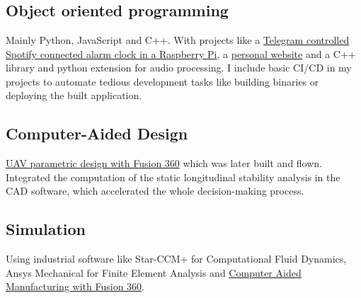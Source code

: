  \section*{\faWrench} \label{sec:skills}

\subsection{Object oriented programming}
Mainly Python, JavaScript and C++. With projects like a
\href{https://github.com/esdandreu/WakePi}{Telegram controlled Spotify
connected alarm clock in a Raspberry Pi}, a
\href{https://github.com/esdandreu/esdandreu.github.io}{personal website}
and a C++ library and python extension for audio processing. I include basic
CI/CD in my projects to automate tedious development tasks like
building binaries or deploying the built application.

\subsection{Computer-Aided Design}
\href{https://1drv.ms/b/s!AqZvnCxLmXx9hL9DSw-Ee4zU6H5Rcw?e=8hDatB}{UAV
    parametric design with Fusion 360} which was later built and flown. Integrated
the computation of the static longitudinal stability analysis in the CAD
software, which accelerated the whole decision-making process.

\subsection{Simulation}
Using industrial software like Star-CCM+ for Computational Fluid Dynamics, Ansys
Mechanical for Finite Element Analysis and
\href{https://upvedues-my.sharepoint.com/:v:/g/personal/angibo2_upv_edu_es/EdjN2F7wqulLhB52aju3Q_cBvuYI8B9KSRrEgAU7Ta_I_g?e=SFogxW}{Computer
Aided Manufacturing with Fusion 360}. 